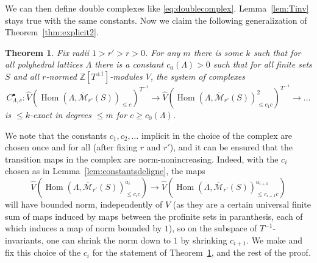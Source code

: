 \documentclass[11pt]{amsart}
\DeclareMathOperator{\Hom}{Hom}
\numberwithin{equation}{section}
\newtheorem{theorem}{Theorem}
\numberwithin{theorem}{section}
\theoremstyle{definition}
\begin{document}
We can then define double complexes like \eqref{eq:doublecomplex}. Lemma~\ref{lem:Tinv} stays true with the same constants. Now we claim the following generalization of Theorem~\ref{thm:explicit2}.

\begin{theorem}\label{thm:explicit3} Fix radii $1>r'>r>0$. For any $m$ there is some $k$ such that for all polyhedral lattices $\Lambda$ there is a constant $c_0(\Lambda)>0$ such that for all finite sets $S$ and all $r$-normed $\mathbb Z[T^{\pm 1}]$-modules $V$, the system of complexes
\[
C_{\Lambda,c}^\bullet: \widehat{V}(\Hom(\Lambda,\overline{\mathcal M}_{r'}(S))_{\leq c})^{T^{-1}}\to \widehat{V}(\Hom(\Lambda,\overline{\mathcal M}_{r'}(S))_{\leq c_1c}^2)^{T^{-1}}\to \ldots
\]
is $\leq k$-exact in degrees $\leq m$ for $c\geq c_0(\Lambda)$.
\end{theorem}

We note that the constants $c_1,c_2,\ldots$ implicit in the choice of the complex are chosen once and for all (after fixing $r$ and $r'$), and it can be ensured that the transition maps in the complex are norm-nonincreasing. Indeed, with the $c_i$ chosen as in Lemma~\ref{lem:constantsdeligne}, the maps
\[
\widehat{V}(\Hom(\Lambda,\overline{\mathcal M}_{r'}(S))_{\leq c_ic}^{a_i})\to \widehat{V}(\Hom(\Lambda,\overline{\mathcal M}_{r'}(S))_{\leq c_{i+1}c}^{a_{i+1}})
\]
will have bounded norm, independently of $V$ (as they are a certain universal finite sum of maps induced by maps between the profinite sets in paranthesis, each of which induces a map of norm bounded by $1$), so on the subspace of $T^{-1}$-invariants, one can shrink the norm down to $1$ by shrinking $c_{i+1}$. We make and fix this choice of the $c_i$ for the statement of Theorem~\ref{thm:explicit3}, and the rest of the proof.
\end{document}
